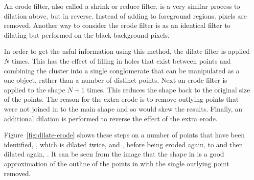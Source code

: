 An erode filter, also called a shrink or reduce filter, is a very similar
process to dilation above, but in reverse. Instead of adding to foreground
regions, pixels are removed. Another way to consider the erode filter is as an
identical filter to dilating but performed on the black background pixels.

In order to get the usful information using this method, the dilate filter is
applied $N$ times. This has the effect of filling in holes that exist
between points and combining the cluster into a single conglomerate that can be
manipulated as a one object, rather than a number of distinct points. Next an
erode filter is applied to the shape $N+1$ times. This reduces the shape back
to the original size of the points. The reason for the extra erode is to remove
outlying points that were not joined in to the main shape and so would skew the
results. Finally, an additional dilation is performed to reverse the effect of
the extra erode.

Figure~\ref{fig:dilate-erode} shows these steps on a number of points that have
been identified, , which is dilated twice,  and
, before being eroded again,  to
 and then dilated again, . It can be seen from
the image that the shape in  is a good approximation of the
outline of the points in  with the single outlying point
removed.

